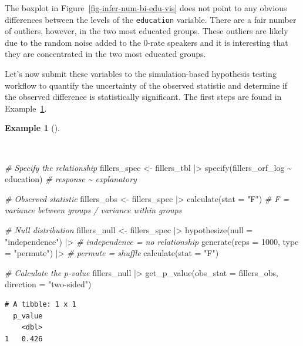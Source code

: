 \documentclass[
  letterpaper,
]{latex/krantz}
\newenvironment{Shaded}{\begin{snugshade}}{\end{snugshade}}
\newcommand{\AttributeTok}[1]{\textcolor[rgb]{0.00,0.00,0.00}{#1}}
\newcommand{\CommentTok}[1]{\textcolor[rgb]{0.00,0.00,0.00}{\textit{#1}}}
\newcommand{\DecValTok}[1]{\textcolor[rgb]{0.00,0.00,0.00}{#1}}
\newcommand{\FunctionTok}[1]{\textcolor[rgb]{0.00,0.00,0.00}{#1}}
\newcommand{\NormalTok}[1]{\textcolor[rgb]{0.00,0.00,0.00}{#1}}
\newcommand{\OtherTok}[1]{\textcolor[rgb]{0.00,0.00,0.00}{#1}}
\newcommand{\SpecialCharTok}[1]{\textcolor[rgb]{0.00,0.00,0.00}{#1}}
\newcommand{\StringTok}[1]{\textcolor[rgb]{0.00,0.00,0.00}{#1}}
\theoremstyle{definition}
\newtheorem{example}{Example}[chapter]
\theoremstyle{remark}
\begin{document}
The boxplot in Figure~\ref{fig-infer-num-bi-edu-vis} does not point to
any obvious differences between the levels of the \texttt{education}
variable. There are a fair number of outliers, however, in the two most
educated groups. These outliers are likely due to the random noise added
to the 0-rate speakers and it is interesting that they are concentrated
in the two most educated groups.

Let's now submit these variables to the simulation-based hypothesis
testing workflow to quantify the uncertainty of the observed statistic
and determine if the observed difference is statistically significant.
The first steps are found in Example~\ref{exm-infer-num-bi-edu}.

\begin{example}[]\protect\hypertarget{exm-infer-num-bi-edu}{}\label{exm-infer-num-bi-edu}

~

\begin{Shaded}
\begin{Highlighting}[]
\CommentTok{\# Specify the relationship}
\NormalTok{fillers\_spec }\OtherTok{\textless{}{-}}
\NormalTok{  fillers\_tbl }\SpecialCharTok{|\textgreater{}}
  \FunctionTok{specify}\NormalTok{(fillers\_orf\_log }\SpecialCharTok{\textasciitilde{}}\NormalTok{ education) }\CommentTok{\# response \textasciitilde{} explanatory}

\CommentTok{\# Observed statistic}
\NormalTok{fillers\_obs }\OtherTok{\textless{}{-}}
\NormalTok{  fillers\_spec }\SpecialCharTok{|\textgreater{}}
  \FunctionTok{calculate}\NormalTok{(}\AttributeTok{stat =} \StringTok{"F"}\NormalTok{) }\CommentTok{\# F = variance between groups / variance within groups}

\CommentTok{\# Null distribution}
\NormalTok{fillers\_null }\OtherTok{\textless{}{-}}
\NormalTok{  fillers\_spec }\SpecialCharTok{|\textgreater{}}
  \FunctionTok{hypothesize}\NormalTok{(}\AttributeTok{null =} \StringTok{"independence"}\NormalTok{) }\SpecialCharTok{|\textgreater{}} \CommentTok{\# independence = no relationship}
  \FunctionTok{generate}\NormalTok{(}\AttributeTok{reps =} \DecValTok{1000}\NormalTok{, }\AttributeTok{type =} \StringTok{"permute"}\NormalTok{) }\SpecialCharTok{|\textgreater{}} \CommentTok{\# permute = shuffle}
  \FunctionTok{calculate}\NormalTok{(}\AttributeTok{stat =} \StringTok{"F"}\NormalTok{)}

\CommentTok{\# Calculate the $p${-}value}
\NormalTok{fillers\_null }\SpecialCharTok{|\textgreater{}}
  \FunctionTok{get\_p\_value}\NormalTok{(}\AttributeTok{obs\_stat =}\NormalTok{ fillers\_obs, }\AttributeTok{direction =} \StringTok{"two{-}sided"}\NormalTok{)}
\end{Highlighting}
\end{Shaded}

\begin{verbatim}
# A tibble: 1 x 1
  p_value
    <dbl>
1   0.426
\end{verbatim}

\end{example}
\end{document}
